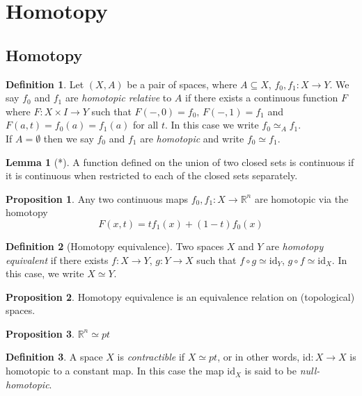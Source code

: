 \documentclass[a4paper,14pt]{extarticle}
\theoremstyle{definition}
\newtheorem*{definition}{Definition}
\newtheorem*{lemma}{Lemma}
\newtheorem*{proposition}{Proposition}
\begin{document}
\section{Homotopy}

\subsection{Homotopy}

\begin{definition}
  Let $(X,A)$ be a pair of spaces, where $A\subseteq X$, $f_0,f_1:X\rightarrow Y$. We say
  $f_0$ and $f_1$ are \emph{homotopic relative} to $A$ if there exists a continuous 
  function $F$ where
  $F:X\times I\rightarrow Y$ such that $F(-,0)=f_0, \,F(-,1)=f_1$ and $F(a,t)=f_0(a)=f_1(a)$ 
  for all $t$. In this case we write $f_0\simeq_A f_1$. \\

  If $A=\emptyset$ then we say $f_0$ and $f_1$ are \emph{homotopic} and write $f_0\simeq f_1$.
\end{definition}

\begin{lemma}[*]
  A function defined on the union of two closed sets is continuous if it is continuous when 
  restricted to each of the closed sets separately.
\end{lemma}

\begin{proposition}
  Any two continuous maps $f_0,f_1:X\rightarrow \mathbb{R}^n$ are homotopic via the homotopy
  \[F(x,t)=tf_1(x)+(1-t)f_0(x)\]
\end{proposition}

\begin{definition}[Homotopy equivalence]
  Two spaces $X$ and $Y$ are \emph{homotopy equivalent} if there exists 
  $f:X\rightarrow Y$, $g:Y\rightarrow X$ such that 
  $f\circ g\simeq\text{id}_Y$, $g\circ f\simeq\text{id}_X$. In this case, we write 
  $X\simeq Y$.
\end{definition}

\begin{proposition}
  Homotopy equivalence is an equivalence relation on (topological) spaces.
\end{proposition}

\begin{proposition}
  $\mathbb{R}^n\simeq pt$
\end{proposition}

\begin{definition}
  A space $X$ is \emph{contractible} if $X\simeq pt$, or in other words,
  $\text{id}:X\rightarrow X$ is homotopic to 
  a constant map. In this case the map $\text{id}_X$ is said to be \emph{null-homotopic}.
\end{definition}
\end{document}
